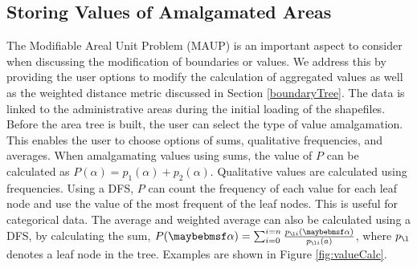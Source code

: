 \subsection{Storing Values of Amalgamated Areas} \label{sec:value}
The Modifiable Areal Unit Problem (MAUP) \cite{openshaw1984modifiable} is an important aspect to consider when discussing the modification of boundaries or values. We address this by providing the user options to modify the calculation of aggregated values as well as the weighted distance metric discussed in Section \ref{boundaryTree}. The data is linked to the administrative areas during the initial loading of the shapefiles. Before the area tree is built, the user can select the type of value amalgamation. This enables the user to choose options of sums, qualitative frequencies, and averages.  When amalgamating values using sums, the value of $P$ can be calculated as $P(\alpha) = p_1(\alpha)+p_2(\alpha)$. Qualitative values are calculated using frequencies. Using a DFS, $P$ can count the frequency of each value for each leaf node and use the value of the most frequent of the leaf nodes. This is useful for categorical data. The average and weighted average  can also be calculated using a DFS, by calculating the sum, $P(\alpha) = \sum_{i=0}^{i=n} \frac{p_{\l  i}(\alpha)}{p_{\l i}(a)}$, where $p_{\l} $ denotes a leaf node in the tree. Examples are shown in Figure \ref{fig:valueCalc}.

